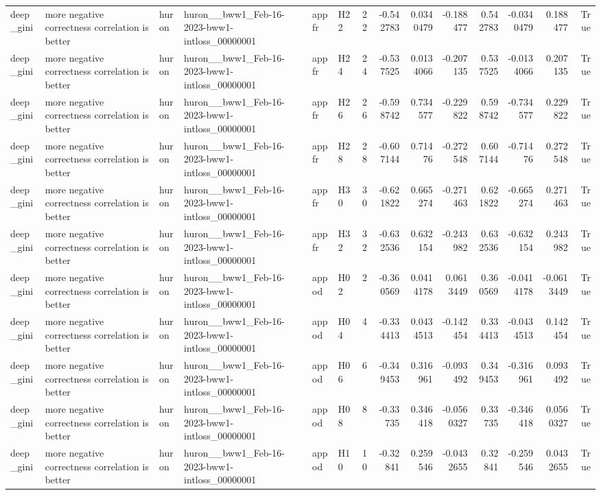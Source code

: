 \begin{longtable}{llllllrrrrrrrr}
deep\_gini & more negative correctness correlation is better & huron & huron\_\_bww1\_Feb-16-2023-bww1-intloss\_00000001 & appfr & H22 & 22 & -0.542783 & 0.0340479 & -0.188477 & 0.542783 & -0.0340479 & 0.188477 & True \\
deep\_gini & more negative correctness correlation is better & huron & huron\_\_bww1\_Feb-16-2023-bww1-intloss\_00000001 & appfr & H24 & 24 & -0.537525 & 0.0134066 & -0.207135 & 0.537525 & -0.0134066 & 0.207135 & True \\
deep\_gini & more negative correctness correlation is better & huron & huron\_\_bww1\_Feb-16-2023-bww1-intloss\_00000001 & appfr & H26 & 26 & -0.598742 & 0.734577 & -0.229822 & 0.598742 & -0.734577 & 0.229822 & True \\
deep\_gini & more negative correctness correlation is better & huron & huron\_\_bww1\_Feb-16-2023-bww1-intloss\_00000001 & appfr & H28 & 28 & -0.607144 & 0.71476 & -0.272548 & 0.607144 & -0.71476 & 0.272548 & True \\
deep\_gini & more negative correctness correlation is better & huron & huron\_\_bww1\_Feb-16-2023-bww1-intloss\_00000001 & appfr & H30 & 30 & -0.621822 & 0.665274 & -0.271463 & 0.621822 & -0.665274 & 0.271463 & True \\
deep\_gini & more negative correctness correlation is better & huron & huron\_\_bww1\_Feb-16-2023-bww1-intloss\_00000001 & appfr & H32 & 32 & -0.632536 & 0.632154 & -0.243982 & 0.632536 & -0.632154 & 0.243982 & True \\
deep\_gini & more negative correctness correlation is better & huron & huron\_\_bww1\_Feb-16-2023-bww1-intloss\_00000001 & appod & H02 & 2 & -0.360569 & 0.0414178 & 0.0613449 & 0.360569 & -0.0414178 & -0.0613449 & True \\
deep\_gini & more negative correctness correlation is better & huron & huron\_\_bww1\_Feb-16-2023-bww1-intloss\_00000001 & appod & H04 & 4 & -0.334413 & 0.0434513 & -0.142454 & 0.334413 & -0.0434513 & 0.142454 & True \\
deep\_gini & more negative correctness correlation is better & huron & huron\_\_bww1\_Feb-16-2023-bww1-intloss\_00000001 & appod & H06 & 6 & -0.349453 & 0.316961 & -0.093492 & 0.349453 & -0.316961 & 0.093492 & True \\
deep\_gini & more negative correctness correlation is better & huron & huron\_\_bww1\_Feb-16-2023-bww1-intloss\_00000001 & appod & H08 & 8 & -0.33735 & 0.346418 & -0.0560327 & 0.33735 & -0.346418 & 0.0560327 & True \\
deep\_gini & more negative correctness correlation is better & huron & huron\_\_bww1\_Feb-16-2023-bww1-intloss\_00000001 & appod & H10 & 10 & -0.32841 & 0.259546 & -0.0432655 & 0.32841 & -0.259546 & 0.0432655 & True \\

\end{longtable}
